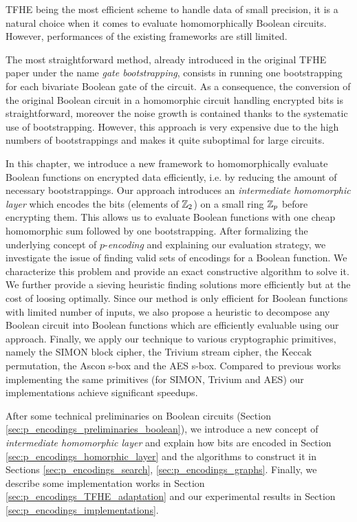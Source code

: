 

TFHE being the most efficient scheme to handle data of small precision, it is a natural choice when it comes to evaluate homomorphically Boolean circuits. However, performances of the existing frameworks are still limited. 

The most straightforward method, already introduced in the original TFHE paper \cite{JC:CGGI20} under the name \emph{gate bootstrapping}, consists in running one bootstrapping for each bivariate Boolean gate of the circuit. As a consequence, the conversion of the original Boolean circuit in a homomorphic circuit handling encrypted bits is straightforward, moreover the noise growth is contained thanks to the systematic use of bootstrapping. However, this approach is very expensive due to the high numbers of bootstrappings and makes it quite suboptimal for large circuits.


In this chapter, we introduce a new framework to homomorphically evaluate Boolean functions on encrypted data efficiently, i.e. by reducing the amount of necessary bootstrappings. Our approach introduces an \emph{intermediate homomorphic layer} which encodes the bits (elements of $\mathbb{Z}_2$) on a small ring $\mathbb{Z}_p$ before encrypting them. This allows us to evaluate Boolean functions with one cheap homomorphic sum followed by one bootstrapping. After formalizing the underlying concept of $p$-\emph{encoding} and explaining our evaluation strategy, we investigate the issue of finding valid sets of encodings for a Boolean function. We characterize this problem and provide an exact constructive algorithm to solve it. We further provide a sieving heuristic finding solutions more efficiently but at the cost of loosing optimally. Since our method is only efficient for Boolean functions with limited number of inputs, we also propose a heuristic to decompose any Boolean circuit into Boolean functions which are efficiently evaluable using our approach. Finally, we apply our technique to various cryptographic primitives, namely the SIMON block cipher, the Trivium stream cipher, the Keccak permutation, the Ascon s-box and the AES s-box. Compared to previous works implementing the same primitives (for SIMON, Trivium and AES) our implementations achieve significant speedups.

After some technical preliminaries on Boolean circuits (Section \ref{sec:p_encodings_preliminaries_boolean}), we introduce a new concept of \emph{intermediate homomorphic layer} and explain how bits are encoded  in Section \ref{sec:p_encodings_homorphic_layer} and the algorithms to construct it in Sections \ref{sec:p_encodings_search}, \ref{sec:p_encodings_graphs}. Finally, we describe some implementation works in Section \ref{sec:p_encodings_TFHE_adaptation} and our experimental results in Section \ref{sec:p_encodings_implementations}.










